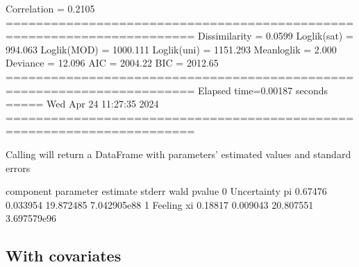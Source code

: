\documentclass[letterpaper,10pt,english]{sphinxmanual}
\begin{document}
\begin{sphinxVerbatim}[commandchars=\\\{\}]
Correlation   = 0.2105
=======================================================================
Dissimilarity = 0.0599
Loglik(sat)   = \PYGZhy{}994.063
Loglik(MOD)   = \PYGZhy{}1000.111
Loglik(uni)   = \PYGZhy{}1151.293
Mean\PYGZhy{}loglik   = \PYGZhy{}2.000
Deviance      = 12.096
\PYGZhy{}\PYGZhy{}\PYGZhy{}\PYGZhy{}\PYGZhy{}\PYGZhy{}\PYGZhy{}\PYGZhy{}\PYGZhy{}\PYGZhy{}\PYGZhy{}\PYGZhy{}\PYGZhy{}\PYGZhy{}\PYGZhy{}\PYGZhy{}\PYGZhy{}\PYGZhy{}\PYGZhy{}\PYGZhy{}\PYGZhy{}\PYGZhy{}\PYGZhy{}\PYGZhy{}\PYGZhy{}\PYGZhy{}\PYGZhy{}\PYGZhy{}\PYGZhy{}\PYGZhy{}\PYGZhy{}\PYGZhy{}\PYGZhy{}\PYGZhy{}\PYGZhy{}\PYGZhy{}\PYGZhy{}\PYGZhy{}\PYGZhy{}\PYGZhy{}\PYGZhy{}\PYGZhy{}\PYGZhy{}\PYGZhy{}\PYGZhy{}\PYGZhy{}\PYGZhy{}\PYGZhy{}\PYGZhy{}\PYGZhy{}\PYGZhy{}\PYGZhy{}\PYGZhy{}\PYGZhy{}\PYGZhy{}\PYGZhy{}\PYGZhy{}\PYGZhy{}\PYGZhy{}\PYGZhy{}\PYGZhy{}\PYGZhy{}\PYGZhy{}\PYGZhy{}\PYGZhy{}\PYGZhy{}\PYGZhy{}\PYGZhy{}\PYGZhy{}\PYGZhy{}\PYGZhy{}
AIC = 2004.22
BIC = 2012.65
=======================================================================
Elapsed time=0.00187 seconds =====\PYGZgt{}\PYGZgt{}\PYGZgt{} Wed Apr 24 11:27:35 2024
=======================================================================
\end{sphinxVerbatim}

\noindent{}

\sphinxAtStartPar
Calling  will return a DataFrame with
parameters’ estimated values and standard errors

\begin{sphinxVerbatim}[commandchars=\\\{\}]
     component parameter  estimate    stderr       wald        pvalue
0  Uncertainty        pi   0.67476  0.033954  19.872485  7.042905e\PYGZhy{}88
1      Feeling        xi   0.18817  0.009043  20.807551  3.697579e\PYGZhy{}96
\end{sphinxVerbatim}


\subsection{With covariates}
\label{\detokenize{manual:with-covariates}}\label{\detokenize{manual:cub-models-with-covariates}}
\sphinxAtStartPar
{}

\sphinxAtStartPar
{}
\end{document}
